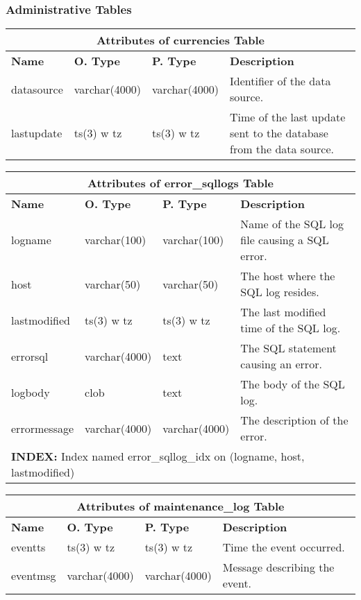\subsubsection{Administrative Tables}
\begin{center}
  \begin{tabular}{|l|l|l|p{3.3in}|}\hline
    \multicolumn{4}{|c|}{\textbf{Attributes of currencies Table}}\\ \hline
    \textbf{Name} & \textbf{O. Type} & \textbf{P. Type} & \textbf{Description}\\ \hline
    datasource & varchar(4000) & varchar(4000) & Identifier of the data source.\\ \hline
    lastupdate & ts(3) w tz & ts(3) w tz & Time of the last update sent to the database from the data source.\\ \hline
  \end{tabular}
\vspace{24pt}

  \begin{tabular}{|l|l|l|p{3.2in}|}\hline
    \multicolumn{4}{|c|}{\textbf{Attributes of error\_sqllogs Table}}\\ \hline
    \textbf{Name} & \textbf{O. Type} & \textbf{P. Type} & \textbf{Description}\\ \hline
    logname & varchar(100) & varchar(100) & Name of the {SQL} log file causing a {SQL} error. \\ \hline
    host & varchar(50) & varchar(50) & The host where the {SQL} log resides.\\ \hline
    lastmodified & ts(3) w tz & ts(3) w tz & The last modified time of the {SQL} log. \\ \hline
    errorsql & varchar(4000) & text & The {SQL} statement causing an error.\\ \hline
    logbody & clob & text & The body of the {SQL} log.\\ \hline
    errormessage & varchar(4000) & varchar(4000) & The description of the error.\\
    \multicolumn{4}{|l|}{\textbf{INDEX:} Index named error\_sqllog\_idx on (logname, host, lastmodified)}\\ \hline
  \end{tabular}
\vspace{24pt}

  \begin{tabular}{|l|l|l|p{3.4in}|}\hline
    \multicolumn{4}{|c|}{\textbf{Attributes of maintenance\_log Table}}\\ \hline
    \textbf{Name} & \textbf{O. Type} & \textbf{P. Type} & \textbf{Description}\\ \hline
    eventts & ts(3) w tz & ts(3) w tz & Time the event occurred.\\ \hline
    eventmsg & varchar(4000) & varchar(4000) & Message describing the event.\\ \hline
  \end{tabular}
\vspace{24pt}


\end{center}
